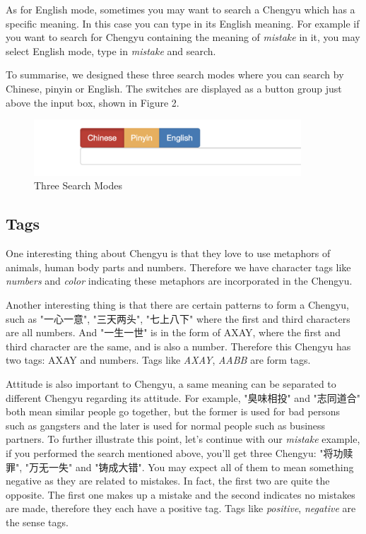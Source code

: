 \documentclass[11pt]{article} %
\begin{document}
As for English mode, sometimes you may want to search a Chengyu which has a specific meaning. In this case you can type in its English meaning. For example if you want to search for Chengyu containing the meaning of \textit{mistake} in it, you may select English mode, type in \textit{mistake} and search.

To summarise, we designed these three search modes where you can search by Chinese, pinyin or English. The switches are displayed as a button group just above the input box, shown in Figure 2.

\begin{figure}[htbp]
\begin{center}
\includegraphics[width=10cm]{searchmode.png}%
\caption{Three Search Modes}
\label{searchmode}
\end{center}
\end{figure}


\subsection{Tags}
\indent One interesting thing about Chengyu is that they love to use metaphors of animals, human body parts and numbers. Therefore we have character tags like \textit{numbers} and \textit{color} indicating these metaphors are incorporated in the Chengyu.

Another interesting thing is that there are certain patterns to form a Chengyu, such as "一心一意", "三天两头", "七上八下" where the first and third characters are all numbers. And "一生一世" is in the form of AXAY, where the first and third character are the same, and is also a number. Therefore this Chengyu has two tags: AXAY and numbers. Tags like \textit{AXAY}, \textit{AABB} are form tags.

Attitude is also important to Chengyu, a same meaning can be separated to different Chengyu regarding its attitude. For example, "臭味相投" and "志同道合" both mean similar people go together, but the former is used for bad persons such as gangsters and the later is used for normal people such as business partners. To further illustrate this point, let's continue with our \textit{mistake} example, if you performed the search mentioned above, you'll get three Chengyu: "将功赎罪", "万无一失" and "铸成大错". You may expect all of them to mean something negative as they are related to mistakes. In fact, the first two are quite the opposite. The first one makes up a mistake and the second indicates no mistakes are made, therefore they each have a positive tag. Tags like \textit{positive}, \textit{negative} are the sense tags.
\end{document}

